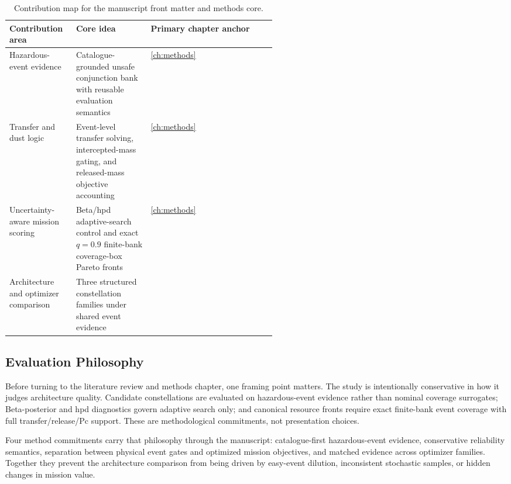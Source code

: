 \begin{table}[htb]
    \centering
    \caption[Contribution map for Chapters 1--3]{Contribution map for the manuscript front matter and methods core.}
    \label{tab:intro_contrib_map}
    \begin{tabularx}{0.92\linewidth}{@{}L{0.25\linewidth}L{0.28\linewidth}Y@{}}
        \toprule
        Contribution area & Core idea & Primary chapter anchor \\
        \midrule
        Hazardous-event evidence & Catalogue-grounded unsafe conjunction bank with reusable evaluation semantics & \cref{ch:methods} \\
        Transfer and dust logic & Event-level transfer solving, intercepted-mass gating, and released-mass objective accounting & \cref{ch:methods} \\
        Uncertainty-aware mission scoring & Beta/\gls{hpd} adaptive-search control and exact \(q=0.9\) finite-bank coverage-box Pareto fronts & \cref{ch:methods} \\
        Architecture and optimizer comparison & Three structured constellation families under shared event evidence &  \\
        \bottomrule
    \end{tabularx}
\end{table}

\subsection{Evaluation Philosophy}
Before turning to the literature review and methods chapter, one framing point matters. The study is intentionally conservative in how it judges architecture quality. Candidate constellations are evaluated on hazardous-event evidence rather than nominal coverage surrogates; Beta-posterior and \gls{hpd} diagnostics govern adaptive search only; and canonical resource fronts require exact finite-bank event coverage with full transfer/release/Pc support. These are methodological commitments, not presentation choices.

Four method commitments carry that philosophy through the manuscript: catalogue-first hazardous-event evidence, conservative reliability semantics, separation between physical event gates and optimized mission objectives, and matched evidence across optimizer families. Together they prevent the architecture comparison from being driven by easy-event dilution, inconsistent stochastic samples, or hidden changes in mission value.

